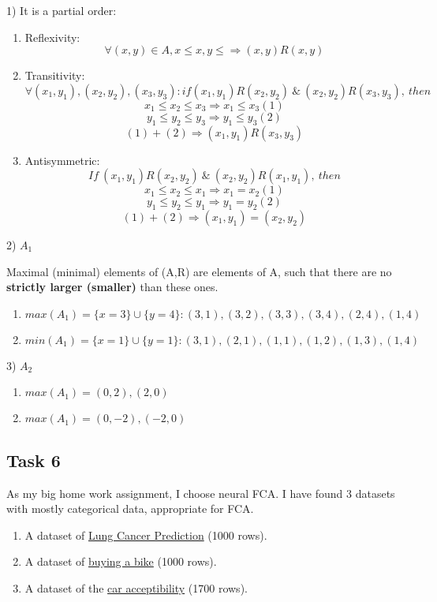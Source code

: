 1) It is a partial order:

\begin{enumerate}
\item Reflexivity:
\[ \forall (x,y) \in A, x \leq x, y \leq \Rightarrow (x,y)R(x,y) \]
\item Transitivity:
\[ \forall (x_1, y_1), (x_2, y_2), (x_3, y_3): if (x_1,y_1)R(x_2,y_2)\ \& \ (x_2,y_2)R(x_3,y_3),\ then \]
\[ x_1 \leq x_2 \leq x_3 \Rightarrow x_1 \leq x_3 (1)\]
\[ y_1 \leq y_2 \leq y_3 \Rightarrow y_1 \leq y_3 (2)\]
\[ (1) + (2) \Rightarrow (x_1,y_1)R(x_3,y_3)\] 
\item Antisymmetric:
\[ If\ (x_1,y_1)R(x_2,y_2)\ \& \ (x_2,y_2)R(x_1,y_1),\ then \]
\[ x_1 \leq x_2 \leq x_1 \Rightarrow x_1=x_2 (1) \]
\[ y_1 \leq y_2 \leq y_1 \Rightarrow y_1=y_2 (2) \]
\[ (1)+(2) \Rightarrow (x_1,y_1) = (x_2, y_2) \]
\end{enumerate}

2) $A_1$

Maximal (minimal) elements of (A,R) are elements of A, such that there are no \textbf{strictly larger (smaller)} than these ones.

\begin{enumerate}
\item $max(A_1) = \{x = 3\} \cup \{y = 4\}: (3, 1), (3, 2), (3, 3), (3, 4), (2, 4), (1, 4)$
\item $min(A_1) = \{x=1\} \cup \{y=1\}: (3, 1), (2, 1), (1, 1), (1, 2), (1, 3), (1, 4) $
\end{enumerate}

3) $A_2$

\begin{enumerate}
\item $max(A_1) = (0,2), (2,0)$
\item $max(A_1) = (0,-2), (-2,0)$
\end{enumerate}

\subsection{Task 6}

As my big home work assignment, I choose neural FCA.
I have found 3 datasets with mostly categorical data, appropriate for FCA.

\begin{enumerate}
\item A dataset of \href{https://www.kaggle.com/datasets/thedevastator/cancer-patients-and-air-pollution-a-new-link}{Lung Cancer Prediction} (1000 rows).
\item A dataset of \href{https://www.kaggle.com/datasets/heeraldedhia/bike-buyers}{buying a bike} (1000 rows).
\item A dataset of the \href{https://www.kaggle.com/datasets/subhajeetdas/car-acceptability-classification-dataset}{car acceptibility} (1700 rows).
\end{enumerate}
